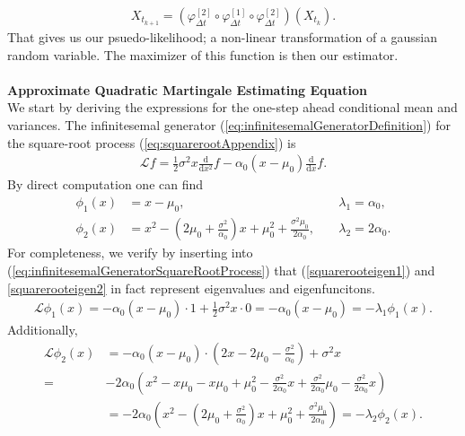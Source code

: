 \begin{align}
    X_{t_{k + 1}} = \left(\varphi_{\Delta t}^{[2]} \circ \varphi_{\Delta t}^{[1]} \circ \varphi_{\Delta t}^{[2]}\right)\left(X_{t_k}\right).
\end{align}
That gives us our psuedo-likelihood; a non-linear transformation of a gaussian random variable. The maximizer of this function is then our estimator. \\\\
\noindent \textbf{Approximate Quadratic Martingale Estimating Equation}\\
We start by deriving the expressions for the one-step ahead conditional mean and variances. The infinitesemal generator (\ref{eq:infinitesemalGeneratorDefinition}) for the square-root process (\ref{eq:squarerootAppendix}) is 
\begin{align}
    \mathcal{L}f = \frac{1}{2}\sigma^2x\frac{\mathrm{d}}{\mathrm{d}x^2}f -\alpha_0\left(x - \mu_0\right)\frac{\mathrm{d}}{\mathrm{d}x}f. \label{eq:infinitesemalGeneratorSquareRootProcess}
\end{align}
By direct computation one can find 
\begin{align}
    \phi_1(x) &= x-\mu_0, &&\; \lambda_1 = \alpha_0, \label{squarerooteigen1}\\
    \phi_2(x) &= x^2 - \left(2\mu_0 + \frac{\sigma^2}{\alpha_0}\right)x + \mu_0^2 + \frac{\sigma^2\mu_0}{2\alpha_0}, &&\; \lambda_2 = 2\alpha_0. \label{squarerooteigen2}
\end{align}
For completeness, we verify by inserting into (\ref{eq:infinitesemalGeneratorSquareRootProcess}) that (\ref{squarerooteigen1}) and \ref{squarerooteigen2} in fact represent eigenvalues and eigenfuncitons.
\begin{align}
    \mathcal{L}\phi_1(x) = -\alpha_0\left(x - \mu_0\right)\cdot 1 + \frac{1}{2}\sigma^2 x \cdot 0 = -\alpha_0\left(x - \mu_0\right) = -\lambda_1\phi_1(x). \label{eq:directVerificationCondMean}
\end{align}
Additionally,
\begin{align}
    \mathcal{L}\phi_2(x) &= -\alpha_0\left(x - \mu_0\right)\cdot \left(2x -2\mu_0 - \frac{\sigma^2}{\alpha_0}\right) + \sigma^2x\\
    =& -2\alpha_0\left(x^2-x\mu_0 - x\mu_0 + \mu_0^2 -\frac{\sigma^2}{2\alpha_0}x + \frac{\sigma^2}{2\alpha_0}\mu_0 - \frac{\sigma^2}{2\alpha_0}x \right)\\
    &= -2\alpha_0 \left(x^2 -\left(2\mu_0+\frac{\sigma^2}{\alpha_0}\right)x + \mu_0^2 + \frac{\sigma^2\mu_0}{2\alpha_0}\right) = -\lambda_2\phi_2(x).\\
\end{align}
